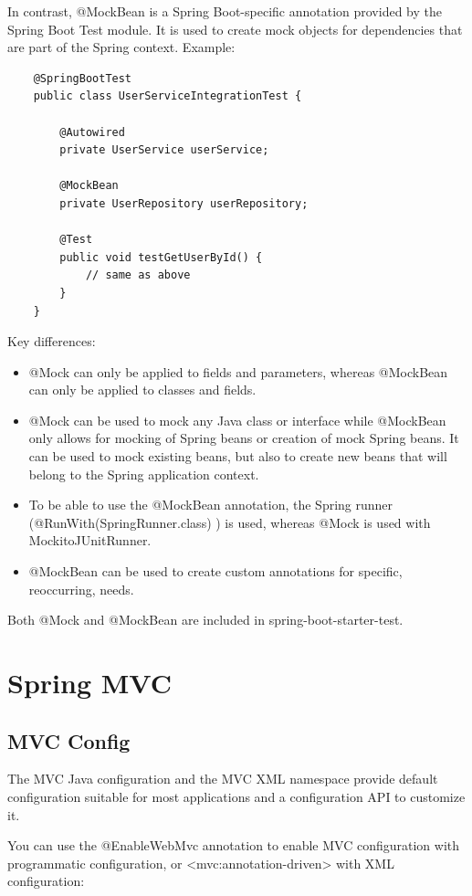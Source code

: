 \documentclass{scrartcl}
\begin{document}
In contrast, @MockBean is a Spring Boot-specific annotation provided by the Spring Boot Test module. It is used to create mock objects for dependencies that are part of the Spring context.
Example:

\begin{lstlisting}
    @SpringBootTest
    public class UserServiceIntegrationTest {

        @Autowired
        private UserService userService;

        @MockBean
        private UserRepository userRepository;

        @Test
        public void testGetUserById() {
            // same as above
        }
    }
\end{lstlisting}


Key differences:

\begin{itemize}
    \item @Mock can only be applied to fields and parameters, whereas @MockBean can only be applied to classes and fields.
    \item @Mock can be used to mock any Java class or interface while @MockBean only allows for mocking of Spring beans or creation of mock Spring beans. It can be used to mock existing beans, but also to create new beans that will belong to the Spring application context.
    \item To be able to use the @MockBean annotation, the Spring runner (@RunWith(SpringRunner.class) ) is used, whereas @Mock is used with MockitoJUnitRunner.
    \item @MockBean can be used to create custom annotations for specific, reoccurring, needs.
\end{itemize}

Both @Mock and @MockBean are included in spring-boot-starter-test.

\section{Spring MVC}
\subsection{MVC Config}

The MVC Java configuration and the MVC XML namespace provide default configuration suitable for most applications and a configuration API to customize it.

You can use the @EnableWebMvc annotation to enable MVC configuration with programmatic configuration, or <mvc:annotation-driven> with XML configuration:
\end{document}
